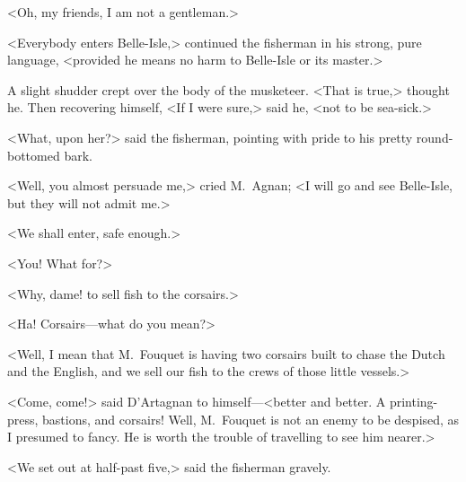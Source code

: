 <Oh, my friends, I am not a gentleman.>

<Everybody enters Belle-Isle,> continued the fisherman in his strong, pure language, <provided he means no harm to Belle-Isle or its master.>

A slight shudder crept over the body of the musketeer. <That is true,> thought he. Then recovering himself, <If I were sure,> said he, <not to be sea-sick.>

<What, upon her?> said the fisherman, pointing with pride to his pretty round-bottomed bark.

<Well, you almost persuade me,> cried M.~Agnan; <I will go and see Belle-Isle, but they will not admit me.>

<We shall enter, safe enough.>

<You! What for?>

<Why, dame! to sell fish to the corsairs.>

<Ha! Corsairs—what do you mean?>

<Well, I mean that M.~Fouquet is having two corsairs built to chase the Dutch and the English, and we sell our fish to the crews of those little vessels.>

<Come, come!> said D'Artagnan to himself—<better and better. A printing-press, bastions, and corsairs! Well, M.~Fouquet is not an enemy to be despised, as I presumed to fancy. He is worth the trouble of travelling to see him nearer.>

<We set out at half-past five,> said the fisherman gravely.

